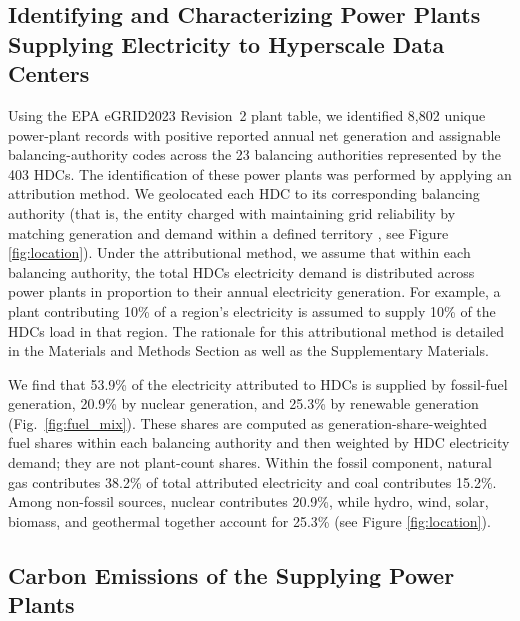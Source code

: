 \documentclass[12pt]{article}
\begin{document}
\subsection*{Identifying and Characterizing Power Plants Supplying Electricity to Hyperscale Data Centers}

Using the EPA eGRID2023 Revision~2 plant table, we identified 8,802 unique power-plant records with positive reported annual net generation and assignable balancing-authority codes across the 23 balancing authorities represented by the 403 HDCs. The identification of these power plants was performed by applying an attribution method\cite{brander_most_2022}. We geolocated each HDC to its corresponding balancing authority (that is, the entity charged with maintaining grid reliability by matching generation and demand within a defined territory \cite{epa_egrid_faq}, see  Figure \ref{fig:location}). Under the attributional method, we assume that within each balancing authority,  the total HDCs electricity demand is distributed across power plants in proportion to their annual electricity generation. For example, a plant contributing 10\% of a region’s electricity is assumed to supply 10\% of the HDCs load in that region. The rationale for this attributional method is detailed in the Materials and Methods Section as well as the Supplementary Materials.

We find that 53.9\% of the electricity attributed to HDCs is supplied by fossil-fuel generation, 20.9\% by nuclear generation, and 25.3\% by renewable generation (Fig.~\ref{fig:fuel_mix}). These shares are computed as generation-share-weighted fuel shares within each balancing authority and then weighted by HDC electricity demand; they are not plant-count shares. Within the fossil component, natural gas contributes 38.2\% of total attributed electricity and coal contributes 15.2\%. Among non-fossil sources, nuclear contributes 20.9\%, while hydro, wind, solar, biomass, and geothermal together account for 25.3\% (see  Figure \ref{fig:location}).

\subsection*{Carbon Emissions of the Supplying Power Plants}
\end{document}
